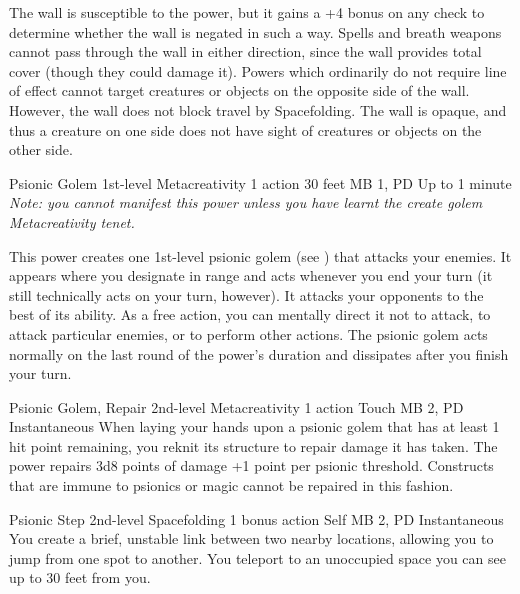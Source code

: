 The wall is susceptible to the  power,
but it gains a +4 bonus on any check
to determine whether the wall is negated in such a way.
Spells and breath weapons cannot pass through the wall
in either direction,
since the wall provides total cover
(though they could damage it).
Powers which ordinarily do not require line of effect
cannot target creatures or objects
on the opposite side of the wall.
However, the wall does not block travel by Spacefolding.
The wall is opaque, and thus a creature on one side does not have
sight of creatures or objects on the other side.

\DndPowerHeader%
  {Psionic Golem}
  {1st-level Metacreativity}
  {1 action}
  {30 feet}
  {MB 1, PD \lvlone}
  {Up to 1 minute}
  \textit{Note: you cannot manifest this power unless
  you have learnt the create golem Metacreativity tenet.}
  
  This power creates one 1st-level psionic golem
  (see )
  that attacks your enemies.
  It appears where you designate in range and acts
  whenever you end your turn
  (it still technically acts on your turn, however).
  It attacks your opponents to the best of its ability.
  As a free action,
  you can mentally direct it not to attack,
  to attack particular enemies,
  or to perform other actions.
  The psionic golem acts normally on the last round
  of the power's duration
  and dissipates after you finish your turn.

\DndPowerHeader%
  {Psionic Golem, Repair}
  {2nd-level Metacreativity}
  {1 action}
  {Touch}
  {MB 2, PD \lvltwo}
  {Instantaneous}
  When laying your hands upon a psionic golem
  that has at least 1 hit point remaining,
  you reknit its structure to repair damage it has taken.
  The power repairs 3d8 points of damage
  +1 point per psionic threshold.
  Constructs that are immune to psionics or magic
  cannot be repaired in this fashion.

\DndPowerHeader%
  {Psionic Step}
  {2nd-level Spacefolding}
  {1 bonus action}
  {Self}
  {MB 2, PD \lvltwo}
  {Instantaneous}
You create a brief, unstable link between two nearby locations,
allowing you to jump from one spot to another.
You teleport to an unoccupied space you can see
up to 30 feet from you.

